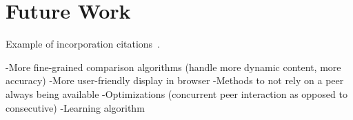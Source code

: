 \section{Future Work}
\label{sec:future}

Example of incorporation citations~\cite{coral:nsdi04}.

-More fine-grained comparison algorithms (handle more dynamic content, more accuracy)
-More user-friendly display in browser
-Methods to not rely on a peer always being available
-Optimizations (concurrent peer interaction as opposed to consecutive)
-Learning algorithm


